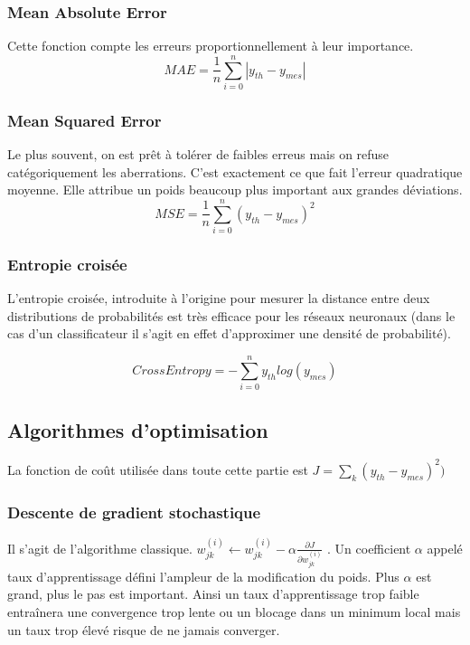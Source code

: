 \subsubsection{Mean Absolute Error}
Cette fonction compte les erreurs proportionnellement à leur importance.
\begin{displaymath}
MAE = \frac{1}{n} \sum\limits_{i = 0}^{n} |y_{th} - y_{mes}|
\end{displaymath}

\subsubsection{Mean Squared Error}
Le plus souvent, on est prêt à tolérer de faibles erreus mais on refuse catégoriquement les aberrations. C'est exactement ce que fait l'erreur quadratique moyenne. Elle attribue un poids beaucoup plus important aux grandes déviations.
\begin{displaymath}
MSE = \frac{1}{n} \sum\limits_{i = 0}^{n} (y_{th} - y_{mes})^2
\end{displaymath}

\subsubsection{Entropie croisée}
L'entropie croisée, introduite à l'origine pour mesurer la distance entre deux distributions de probabilités est très efficace pour les réseaux neuronaux (dans le cas d'un classificateur il s'agit en effet d'approximer une densité de probabilité).

\begin{displaymath}
Cross Entropy = - \sum\limits_{i = 0}^{n} y_{th}  log(y_{mes})
\end{displaymath}

\subsection{Algorithmes d'optimisation}
La fonction de coût utilisée dans toute cette partie est $J = \sum\limits_{k} (y_{th} - y_{mes})^2)$


\subsubsection{Descente de gradient stochastique}
Il s'agit de l'algorithme classique.  $w_{jk}^{(i)} \leftarrow w_{jk}^{(i)} - \alpha \frac{\partial J}{\partial w_{jk}^{(i)}}$ . Un coefficient $\alpha$ appelé taux d'apprentissage défini l'ampleur de la modification du poids. Plus $\alpha$ est grand, plus le pas est important. Ainsi un taux d'apprentissage trop faible entraînera une convergence trop lente ou un blocage dans un minimum local mais un taux trop élevé risque de ne jamais converger. 

